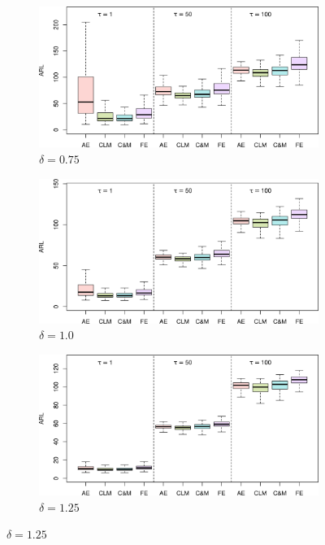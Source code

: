 \begin{figure}
\begin{subfigure}{0.49\textwidth}
\end{subfigure}
\begin{subfigure}{0.49\textwidth}
  \centering
  \caption{$ \delta = 0.75$}
  \label{fig:lambda=0.15/theta=4.0/delta=0.75}
  \includegraphics[width=\textwidth]{img/sims/theta=4.0_signedEWMA(l = 0.15, upw = true, L = 1.0)/delta=0.75.png}
\end{subfigure}
\begin{subfigure}{0.49\textwidth}
  \centering
  \caption{$ \delta = 1.0$}
  \label{fig:lambda=0.15/theta=4.0/delta=1.0}
  \includegraphics[width=\textwidth]{img/sims/theta=4.0_signedEWMA(l = 0.15, upw = true, L = 1.0)/delta=1.00.png}
\end{subfigure}
\begin{subfigure}{0.49\textwidth}
  \centering
  \caption{$ \delta = 1.25$}
  \label{fig:lambda=0.15/theta=4.0/delta=1.25}
  \includegraphics[width=\textwidth]{img/sims/theta=4.0_signedEWMA(l = 0.15, upw = true, L = 1.0)/delta=1.25.png}

\end{subfigure}
\end{figure}

